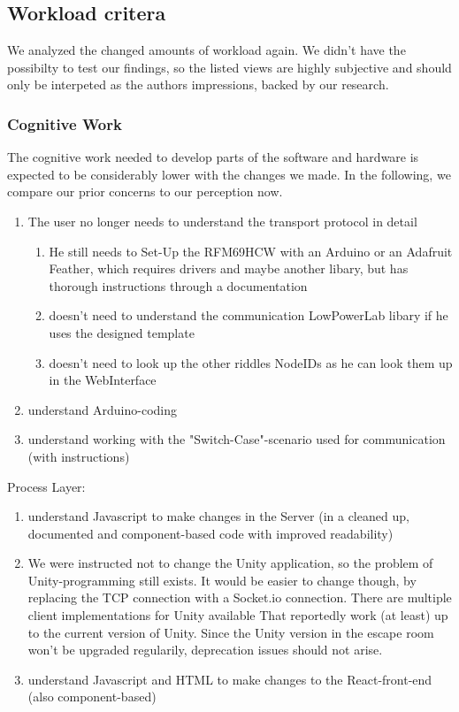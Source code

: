 \subsection{Workload critera}
We analyzed the changed amounts of workload again. 
We didn't have the possibilty to test our findings, so the listed views are highly subjective 
and should only be interpeted as the authors impressions, backed by our research.
\subsubsection{Cognitive Work}
The cognitive work needed to develop parts 
of the software and hardware is expected to be considerably lower with the changes we made.
In the following, we compare our prior concerns to our perception now.
\begin{enumerate}
    \item The user no longer needs to understand the transport protocol in detail
    \begin{enumerate}
        \item 
        He still needs to Set-Up the RFM69HCW with an Arduino or an Adafruit Feather, 
        which requires drivers and maybe another libary, but has thorough instructions through a documentation
        \item doesn't need to understand the communication LowPowerLab libary if he uses the designed template
        \item doesn't need to look up the other riddles NodeIDs as he can look them up in the WebInterface
    \end{enumerate}   
    \item understand Arduino-coding 
    \item understand working with the "Switch-Case"-scenario used for communication (with instructions)
\end{enumerate}  
Process Layer:
\begin{enumerate}
    \item understand Javascript to make changes in the Server (in a cleaned up, documented and component-based code with improved readability)
    \item 
    We were instructed not to change the Unity application, so the problem of Unity-programming still exists. 
    It would be easier to change though, by replacing the TCP connection with a Socket.io connection. 
    There are multiple client implementations for Unity available \parencite{socketioUnity1, socketioUnity2,socketioUnity3}
    That reportedly work (at least) up to the current version of Unity. 
    Since the Unity version in the escape room won't be upgraded regularily, deprecation issues should not arise.
    \item understand Javascript and HTML to make changes to the React-front-end (also component-based) 
\end{enumerate}  
